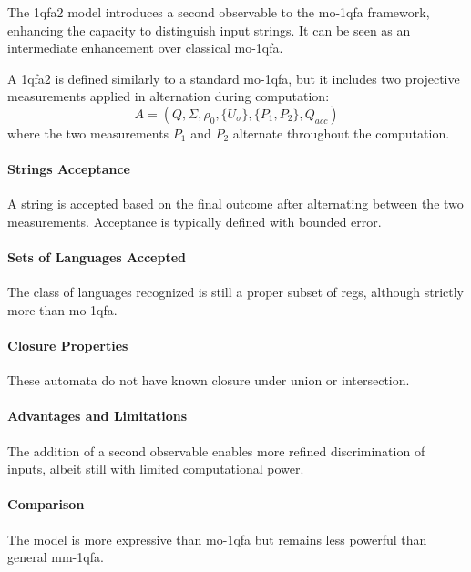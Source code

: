 \subsubsection{}
The \gls{1qfa2} model introduces a second observable to the \gls{mo-1qfa} framework, enhancing the capacity to distinguish input strings. It can be seen as an intermediate enhancement over classical \gls{mo-1qfa}.

\begin{definition}
A \gls{1qfa2} is defined similarly to a standard \gls{mo-1qfa}, but it includes two projective measurements applied in alternation during computation:
\[
A = (Q, \Sigma, \rho_0, \{U_{\sigma}\}, \{P_1, P_2\}, Q_{acc})
\]
where the two measurements \( P_1 \) and \( P_2 \) alternate throughout the computation.
\end{definition}

\paragraph{Strings Acceptance}
A string is accepted based on the final outcome after alternating between the two measurements. Acceptance is typically defined with bounded error.

\paragraph{Sets of Languages Accepted}
The class of languages recognized is still a proper subset of \glspl{reg}, although strictly more than \gls{mo-1qfa}.

\paragraph{Closure Properties}
These automata do not have known closure under union or intersection.

\paragraph{Advantages and Limitations}
The addition of a second observable enables more refined discrimination of inputs, albeit still with limited computational power.

\paragraph{Comparison}
The model is more expressive than \gls{mo-1qfa} but remains less powerful than general \gls{mm-1qfa}.

